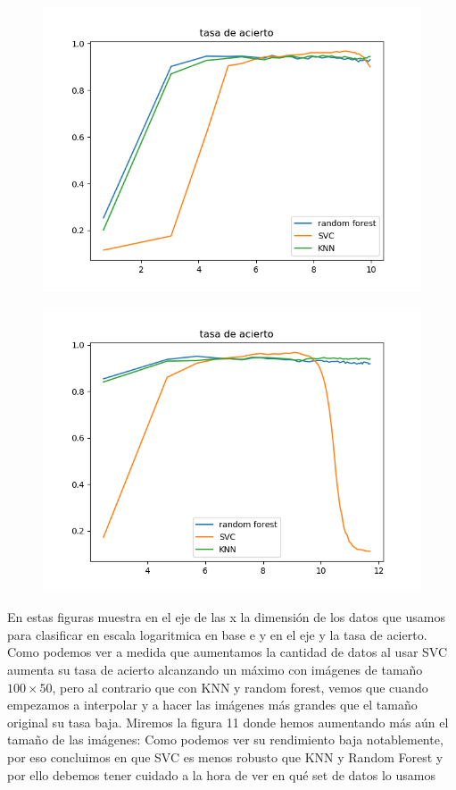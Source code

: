 \documentclass[8pt,a4paper]{{esannV2}}
\begin{document}
\begin{figure}[h]
\centering
\begin{minipage}{.5\textwidth}
  \centering
  \includegraphics[width=0.8\linewidth]{./CompararAciertos.png}
  \label{fig:test1}
\end{minipage}%
\begin{minipage}{.5\textwidth}
  \centering
  \includegraphics[width=0.8\linewidth]{./AciertosFinal.png}
  \label{fig:test2}
\end{minipage}
\end{figure}


En estas figuras muestra en el eje de las x la dimensión de los datos que usamos para clasificar en escala logaritmica en base e y en el eje y la tasa de acierto.
Como podemos ver a medida que aumentamos la cantidad de datos al usar SVC aumenta su tasa de acierto alcanzando un máximo con imágenes de tamaño $100\times50$, pero al contrario que con KNN y random forest, vemos que cuando empezamos a interpolar y a hacer las imágenes más grandes que el tamaño original su tasa baja.
Miremos la figura 11 donde hemos aumentando más aún el tamaño de las imágenes:
Como podemos ver su rendimiento baja notablemente, por eso concluimos en que SVC es menos robusto que KNN y Random Forest y por ello debemos tener cuidado a la hora de ver en qué set de datos lo usamos
\end{document}
